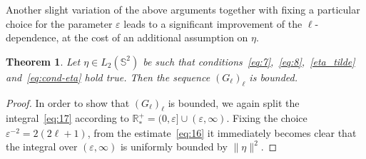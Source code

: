 \documentclass[a4paper,11pt,DIV=11,%
abstract=on%
]{scrartcl}
\newtheorem{thm}{Theorem}[section]
\def\R{{\mathbb R}}
\newcommand{\red}[1]{#1}
\newcommand{\blue}[1]{#1}
\begin{document}
Another slight variation of the above arguments together with fixing a particular choice for the parameter $\varepsilon$ leads to a significant improvement of the $\ell$-dependence, at the cost of \blue{an additional} assumption on $\eta$.

\begin{thm}\label{thm:upper}
  Let $\eta\in L_2(\mathbb S^2)$ be such that \red{
conditions~\eqref{eq:7},~\eqref{eq:8},~\eqref{eta_tilde} 
and~\eqref{eq:cond-eta} hold true.} Then the sequence $(G_\ell)_\ell$ is bounded.
\end{thm}

\begin{proof}
	In order to show that $(G_\ell)_{\ell}$ is bounded, we again
        split the integral~\red{\eqref{eq:17}}    according to
	$\R_*^+=(0,\varepsilon]\cup(\varepsilon,\infty)$. Fixing the choice
	$\varepsilon^{-2}=2(2\ell+1)$, from the estimate~\red{\eqref{eq:16}} it immediately becomes clear that the integral
	over $(\varepsilon,\infty)$ is uniformly bounded by $\|\eta \|^2$. 
	

\end{proof}
\end{document}
